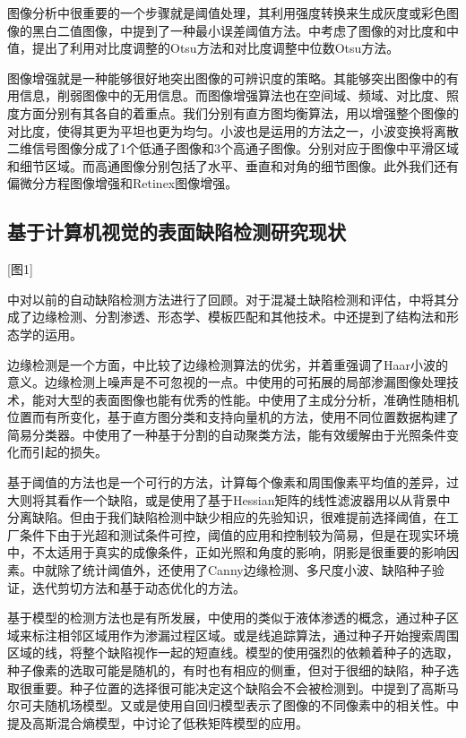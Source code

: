 图像分析中很重要的一个步骤就是阈值处理，其利用强度转换来生成灰度或彩色图像的黑白二值图像，\cite{Kittler:1986:MET:2035720363}中提到了一种最小误差阈值方法。\cite{win2015contrast}中考虑了图像的对比度和中值，提出了利用对比度调整的Otsu方法和对比度调整中位数Otsu方法。

图像增强就是一种能够很好地突出图像的可辨识度的策略。其能够突出图像中的有用信息，削弱图像中的无用信息。而图像增强算法也在空间域、频域、对比度、照度方面分别有其各自的着重点。我们分别有直方图均衡算法，用以增强整个图像的对比度，使得其更为平坦也更为均匀。小波也是运用的方法之一，小波变换将离散二维信号图像分成了1个低通子图像和3个高通子图像。分别对应于图像中平滑区域和细节区域。而高通图像分别包括了水平、垂直和对角的细节图像。此外我们还有偏微分方程图像增强和Retinex图像增强。

\subsection{基于计算机视觉的表面缺陷检测研究现状}

[图1]

\cite{doi101080}中对以前的自动缺陷检测方法进行了回顾。对于混凝土缺陷检测和评估，\cite{rose2014supervised}中将其分成了边缘检测、分割渗透、形态学、模板匹配和其他技术。\cite{7864335}中还提到了结构法和形态学的运用。

边缘检测是一个方面，\cite{doi101061}中比较了边缘检测算法的优劣，并着重强调了Haar小波的意义。边缘检测上噪声是不可忽视的一点。\cite{Yamaguchi2010}中使用的可拓展的局部渗漏图像处理技术，能对大型的表面图像也能有优秀的性能。\cite{abdel2006pca}中使用了主成分分析，准确性随相机位置而有所变化，基于直方图分类和支持向量机的方法，使用不同位置数据构建了简易分类器。\cite{doi0000257}中使用了一种基于分割的自动聚类方法，能有效缓解由于光照条件变化而引起的损失。

基于阈值的方法也是一个可行的方法，计算每个像素和周围像素平均值的差异，过大则将其看作一个缺陷，或是使用了基于Hessian矩阵的线性滤波器用以从背景中分离缺陷。但由于我们缺陷检测中缺少相应的先验知识，很难提前选择阈值，在工厂条件下由于光超和测试条件可控，阈值的应用和控制较为简易，但是在现实环境中，不太适用于真实的成像条件，正如光照和角度的影响，阴影是很重要的影响因素。\cite{doi:1010610000051}中就除了统计阈值外，还使用了Canny边缘检测、多尺度小波、缺陷种子验证，迭代剪切方法和基于动态优化的方法。

基于模型的检测方法也是有所发展，\cite{Yamaguchi2010}中使用的类似于液体渗透的概念，通过种子区域来标注相邻区域用作为渗漏过程区域。或是线追踪算法，通过种子开始搜索周围区域的线，将整个缺陷视作一起的短直线。模型的使用强烈的依赖着种子的选取，种子像素的选取可能是随机的，有时也有相应的侧重，但对于很细的缺陷，种子选取很重要。种子位置的选择很可能决定这个缺陷会不会被检测到。\cite{Masato2000}中提到了高斯马尔可夫随机场模型。又或是使用自回归模型表示了图像的不同像素中的相关性。\cite{SUSAN2017232}中提及高斯混合熵模型，\cite{CEN20151206}中讨论了低秩矩阵模型的应用。

